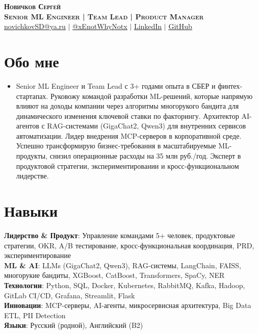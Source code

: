\documentclass[letterpaper,11pt]{article}
\begin{document}
\begin{center}
    \textbf{\huge \scshape Новичков Сергей} \\ \vspace{1pt}
    \textbf{\scshape Senior ML Engineer | Team Lead | Product Manager} \\
    \href{mailto:novichkovSD@ya.ru}{\uline{novichkovSD@ya.ru}} $|$ \href{https://t.me/xEnotWhyNotx}{\uline{@xEnotWhyNotx}} $|$ \href{https://linkedin.com/in/xEnotWhyNotx}{\uline{LinkedIn}} $|$ \href{https://github.com/xEnotWhyNotx}{\uline{GitHub}}
    \vspace{-20pt}
\end{center}

\section{Обо мне}
\begin{itemize}[leftmargin=0.15in, label={}]
    \item \vspace{-5pt} 
    Senior ML Engineer и Team Lead с 3+ годами опыта в СБЕР и финтех-стартапах. Руковожу командой разработки ML-решений, которые напрямую влияют на доходы компании через алгоритмы многорукого бандита для динамического изменения ключевой ставки по факторингу. Архитектор AI-агентов с RAG-системами (GigaChat2, Qwen3) для внутренних сервисов автоматизации. Лидер внедрения MCP-серверов в корпоративной среде. Успешно трансформирую бизнес-требования в масштабируемые ML-продукты, снизил операционные расходы на 35 млн руб./год. Эксперт в продуктовой стратегии, экспериментировании и кросс-функциональном лидерстве.
    \vspace{-15pt}
\end{itemize}

\section{Навыки}
\begin{itemize}[leftmargin=0.15in, label={}]
    \small{\item{
        \vspace{-5pt}
        \textbf{Лидерство \& Продукт}: Управление командами 5+ человек, продуктовые стратегии, OKR, A/B тестирование, кросс-функциональная координация, PRD, экспериментирование \\
        \textbf{ML \& AI}: LLMs (GigaChat2, Qwen3), RAG-системы, LangChain, FAISS, многорукие бандиты, XGBoost, CatBoost, Transformers, SpaCy, NER \\
        \textbf{Технологии}: Python, SQL, Docker, Kubernetes, RabbitMQ, Kafka, Hadoop, GitLab CI/CD, Grafana, Streamlit, Flask \\
        \textbf{Инновации}: MCP-серверы, AI-агенты, микросервисная архитектура, Big Data ETL, PII Detection \\
        \textbf{Языки}: Русский (родной), Английский (B2)
        \vspace{-15pt}
    }}
\end{itemize}
\end{document}
